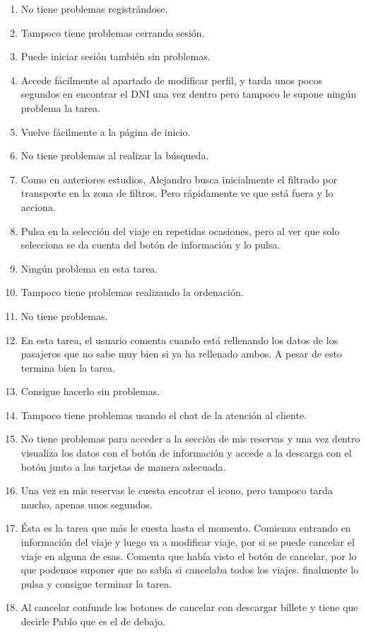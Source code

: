 \begin{enumerate}
    \item No tiene problemas registrándose.
    \item Tampoco tiene problemas cerrando sesión.
    \item Puede iniciar sesión también sin problemas.
    \item Accede fácilmente al apartado de modificar perfil, y tarda unos pocos segundos en encontrar el DNI una vez dentro pero
        tampoco le supone ningún problema la tarea.
    \item Vuelve fácilmente a la página de inicio.
    \item No tiene problemas al realizar la búsqueda.
    \item Como en anteriores estudios, Alejandro busca inicialmente el filtrado por transporte en la zona de filtros. Pero rápidamente ve que
        está fuera y lo acciona.
    \item Pulsa en la selección del viaje en repetidas ocasiones, pero al ver que solo selecciona se
        da cuenta del botón de información y lo pulsa.
    \item Ningún problema en esta tarea.
    \item Tampoco tiene problemas realizando la ordenación.
    \item No tiene problemas.
    \item En esta tarea, el usuario comenta cuando está rellenando los datos de los pasajeros que no sabe muy bien si ya ha rellenado ambos. A pesar
        de esto termina bien la tarea.
    \item Consigue hacerlo sin problemas.
    \item Tampoco tiene problemas usando el chat de la atención al cliente.
    \item No tiene problemas para acceder a la sección de mis reservas y una vez dentro visualiza los datos con el botón de información y accede a la
        descarga con el botón junto a las tarjetas de manera adecuada.
    \item Una vez en mis reservas le cuesta encotrar el icono, pero tampoco tarda mucho, apenas unos segundos.
    \item Ésta es la tarea que más le cuesta hasta el momento. Comienza entrando en información del viaje y luego va a modificar viaje, por si se puede cancelar
        el viaje en alguna de esas. Comenta que había visto el botón de cancelar, por lo que podemos suponer que no sabía si cancelaba todos los viajes. finalmente
        lo pulsa y consigue terminar la tarea.
    \item Al cancelar confunde los botones de cancelar con descargar billete y tiene que decirle Pablo que es el de debajo.
\end{enumerate}

